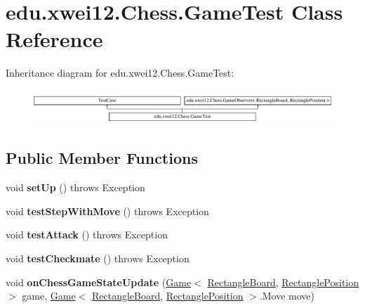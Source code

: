 \hypertarget{classedu_1_1xwei12_1_1_chess_1_1_game_test}{}\section{edu.\+xwei12.\+Chess.\+Game\+Test Class Reference}
\label{classedu_1_1xwei12_1_1_chess_1_1_game_test}
Inheritance diagram for edu.\+xwei12.\+Chess.\+Game\+Test\+:\begin{figure}[H]
\begin{center}
\leavevmode
\includegraphics[height=1.284404cm]{classedu_1_1xwei12_1_1_chess_1_1_game_test}
\end{center}
\end{figure}
\subsection*{Public Member Functions}
\begin{DoxyCompactItemize}
\item 
void {\bfseries set\+Up} ()  throws Exception \hypertarget{classedu_1_1xwei12_1_1_chess_1_1_game_test_a765c13259d70ca44466ab52ae777d314}{}\label{classedu_1_1xwei12_1_1_chess_1_1_game_test_a765c13259d70ca44466ab52ae777d314}

\item 
void {\bfseries test\+Step\+With\+Move} ()  throws Exception \hypertarget{classedu_1_1xwei12_1_1_chess_1_1_game_test_a07811599ac89908fe45422a79011b6ad}{}\label{classedu_1_1xwei12_1_1_chess_1_1_game_test_a07811599ac89908fe45422a79011b6ad}

\item 
void {\bfseries test\+Attack} ()  throws Exception \hypertarget{classedu_1_1xwei12_1_1_chess_1_1_game_test_afb9aa07788e1bfa790ad245c089fdb86}{}\label{classedu_1_1xwei12_1_1_chess_1_1_game_test_afb9aa07788e1bfa790ad245c089fdb86}

\item 
void {\bfseries test\+Checkmate} ()  throws Exception \hypertarget{classedu_1_1xwei12_1_1_chess_1_1_game_test_a277adb71fba990541d5e6774a3db9045}{}\label{classedu_1_1xwei12_1_1_chess_1_1_game_test_a277adb71fba990541d5e6774a3db9045}

\item 
void {\bfseries on\+Chess\+Game\+State\+Update} (\hyperlink{classedu_1_1xwei12_1_1_chess_1_1_game}{Game}$<$ \hyperlink{classedu_1_1xwei12_1_1_chess_1_1_rectangle_board}{Rectangle\+Board}, \hyperlink{classedu_1_1xwei12_1_1_chess_1_1_rectangle_position}{Rectangle\+Position} $>$ game, \hyperlink{classedu_1_1xwei12_1_1_chess_1_1_game}{Game}$<$ \hyperlink{classedu_1_1xwei12_1_1_chess_1_1_rectangle_board}{Rectangle\+Board}, \hyperlink{classedu_1_1xwei12_1_1_chess_1_1_rectangle_position}{Rectangle\+Position} $>$.Move move)\hypertarget{classedu_1_1xwei12_1_1_chess_1_1_game_test_af5ba16d8f21d2b6c9526c9fdaa3292af}{}\label{classedu_1_1xwei12_1_1_chess_1_1_game_test_af5ba16d8f21d2b6c9526c9fdaa3292af}

\end{DoxyCompactItemize}


